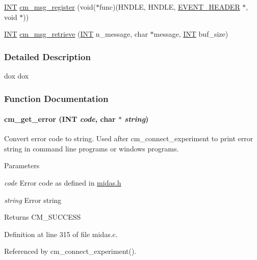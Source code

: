 \begin{DoxyCompactItemize}
\item 
\hyperlink{vppg_8h_a392e62da233ed3e2f7c3fd4f487a3896}{INT} \hyperlink{group__msgfunctionc_gab857885ee2ef24ddef12fb3ecf5c4c7e}{cm\_\-msg\_\-register} (void($\ast$func)(HNDLE, HNDLE, \hyperlink{structEVENT__HEADER}{EVENT\_\-HEADER} $\ast$, void $\ast$))
\item 
\hyperlink{vppg_8h_a392e62da233ed3e2f7c3fd4f487a3896}{INT} \hyperlink{group__msgfunctionc_gad92636d84ec9438a25ca6b17c4e6760d}{cm\_\-msg\_\-retrieve} (\hyperlink{vppg_8h_a392e62da233ed3e2f7c3fd4f487a3896}{INT} n\_\-message, char $\ast$message, \hyperlink{vppg_8h_a392e62da233ed3e2f7c3fd4f487a3896}{INT} buf\_\-size)
\end{DoxyCompactItemize}


\subsubsection{Detailed Description}
dox dox 

\subsubsection{Function Documentation}
\paragraph[{cm\_\-get\_\-error}]{ cm\_\-get\_\-error ({\bf INT} {\em code}, \/  char $\ast$ {\em string})}\hfill\label{group__msgfunctionc_ga42f4420ba3e5b4663f3fdd80a586841e}
Convert error code to string. Used after cm\_\-connect\_\-experiment to print error string in command line programs or windows programs. 
\begin{DoxyParams}{Parameters}
\item[{\em code}]Error code as defined in \hyperlink{midas_8h}{midas.h} \item[{\em string}]Error string \end{DoxyParams}
\begin{DoxyReturn}{Returns}
CM\_\-SUCCESS 
\end{DoxyReturn}


Definition at line 315 of file midas.c.

Referenced by cm\_\-connect\_\-experiment().

